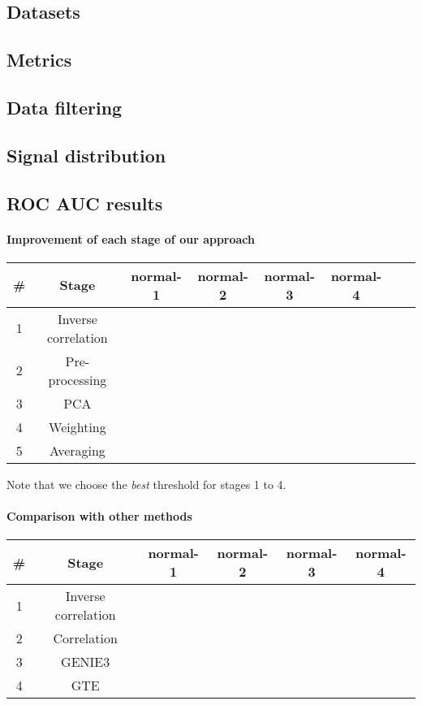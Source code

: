 \documentclass[wcp]{jmlr}
\begin{document}
\subsection{Datasets}




\subsection{Metrics}
\subsection{Data filtering}
\subsection{Signal distribution}
\subsection{ROC AUC results}
\paragraph{Improvement of each stage of our approach\\}


\begin{table}[htb]
\centering
\begin{tabular}{|c|c||c|c|c|c|c|c|} \hline
\# & Stage & normal-1 & normal-2 & normal-3 & normal-4 \\ \hline
1 & Inverse correlation & & & & \\ \hline
2 & Pre-processing & & & &\\ \hline
3 & PCA & & & &  \\ \hline
4 & Weighting & & & &  \\ \hline
5 & Averaging & & & &  \\ \hline

\end{tabular}
\end{table}

Note that we choose the \textit{best} threshold for stages 1 to 4.
\paragraph{Comparison with other methods\\}

\begin{table}[htb]
\centering
\begin{tabular}{|c|c||c|c|c|c|} \hline
\# & Stage & normal-1 & normal-2 & normal-3 & normal-4 \\ \hline
1 & Inverse correlation & & & &\\ \hline
2 & Correlation & & & &\\ \hline
3 & GENIE3 & & & & \\ \hline
4 & GTE & & & & \\ \hline

\end{tabular}
\end{table}
\end{document}
